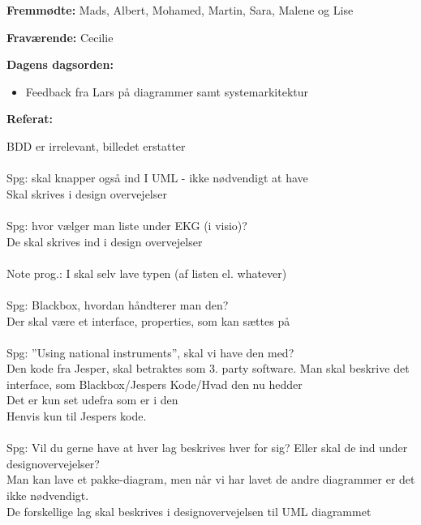 \textbf{Fremmødte:} Mads, Albert, Mohamed, Martin, Sara, Malene og Lise

\textbf{Fraværende:} Cecilie

\textbf{Dagens dagsorden:}
\begin{itemize}
	\item Feedback fra Lars på diagrammer samt systemarkitektur
\end{itemize}

\textbf{Referat:}

BDD er irrelevant, billedet erstatter
\\ \\
Spg: skal knapper også ind I UML - ikke nødvendigt at have \\
	Skal skrives i design overvejelser
\\
\\

Spg: hvor vælger man liste under EKG (i visio)?\\
	De skal skrives ind i design overvejelser
\\
\\

Note prog.: I skal selv lave typen (af listen el. whatever)
\\
\\

Spg: Blackbox, hvordan håndterer man den?\\
	Der skal være et interface, properties, som kan sættes på
\\
\\
	
Spg: ”Using national instruments”, skal vi have den med?\\
	Den kode fra Jesper, skal betraktes som 3. party software.
	Man skal beskrive det interface, som Blackbox/Jespers Kode/Hvad den nu hedder\\
	Det er kun set udefra som er i den\\
	Henvis kun til Jespers kode.
\\
\\

Spg: Vil du gerne have at hver lag beskrives hver for sig? Eller skal de ind under designovervejelser?\\
Man kan lave et pakke-diagram, men når vi har lavet de andre diagrammer er det ikke nødvendigt.\\
De forskellige lag skal beskrives i designovervejelsen til UML diagrammet
\\
\\

